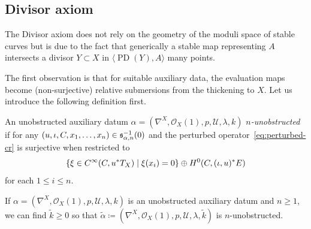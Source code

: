 \documentclass[AHL,Unicode,longabstracts]{cedram}
\makeatletter
\newcommand{\sub}{\subset}
\newcommand{\inv}{^{-1}}
\newcommand{\lspan}[1]{\langle {#1}\rangle}
\newcommand{\inpr}[2]{\langle {#1},{#2} \rangle}
\newcommand{\conn}{\nabla}
\newcommand{\wt}{\widetilde}
\newcommand{\Mbar}{\bar{\mathcal M}}
\newcommand{\bQ}{\mathbb{Q}}
\newcommand{\cO}{\mathcal{O}}
\newcommand{\cU}{\mathcal{U}}
\newcommand{\fs}{\mathfrak{s}}
\DeclareMathOperator{\pcd}{PD}
\let\save@mathaccent\mathaccent
\newcommand*\if@single[3]{%
  \setbox0\hbox{${\mathaccent"0362{#1}}^H$}%
  \setbox2\hbox{${\mathaccent"0362{\kern0pt#1}}^H$}%
  \ifdim\ht0=\ht2 #3\else #2\fi
  }
\newcommand*\rel@kern[1]{\kern#1\dimexpr\macc@kerna}
\newcommand*\widebar[1]{\@ifnextchar^{{\wide@bar{#1}{0}}}{\wide@bar{#1}{1}}}
\newcommand*\wide@bar[2]{\if@single{#1}{\wide@bar@{#1}{#2}{1}}{\wide@bar@{#1}{#2}{2}}}
\newcommand*\wide@bar@[3]{%
  \begingroup
  \def\mathaccent##1##2{%
    \let\mathaccent\save@mathaccent
    \if#32 \let\macc@nucleus\first@char \fi
    \setbox\z@\hbox{$\macc@style{\macc@nucleus}_{}$}%
    \setbox\tw@\hbox{$\macc@style{\macc@nucleus}{}_{}$}%
    \dimen@\wd\tw@
    \advance\dimen@-\wd\z@
    \divide\dimen@ 3
    \@tempdima\wd\tw@
    \advance\@tempdima-\scriptspace
    \divide\@tempdima 10
    \advance\dimen@-\@tempdima
    \ifdim\dimen@>\z@ \dimen@0pt\fi
    \rel@kern{0.6}\kern-\dimen@
    \if#31
      \overline{\rel@kern{-0.6}\kern\dimen@\macc@nucleus\rel@kern{0.4}\kern\dimen@}%
      \advance\dimen@0.4\dimexpr\macc@kerna
      \let\final@kern#2%
      \ifdim\dimen@<\z@ \let\final@kern1\fi
      \if\final@kern1 \kern-\dimen@\fi
    \else
      \overline{\rel@kern{-0.6}\kern\dimen@#1}%
    \fi
  }%
  \macc@depth\@ne
  \let\math@bgroup\@empty \let\math@egroup\macc@set@skewchar
  \mathsurround\z@ \frozen@everymath{\mathgroup\macc@group\relax}%
  \macc@set@skewchar\relax
  \let\mathaccentV\macc@nested@a
  \if#31
    \macc@nested@a\relax111{#1}%
  \else
    \def\gobble@till@marker##1\endmarker{}%
    \futurelet\first@char\gobble@till@marker#1\endmarker
    \ifcat\noexpand\first@char A\else
      \def\first@char{}%
    \fi
    \macc@nested@a\relax111{\first@char}%
  \fi
  \endgroup
}
\let\oldbar\bar
\renewcommand*{\bar}[1]{{\mathchoice{\widebar{#1}}{\widebar{#1}}{\widebar{#1}}{\oldbar{#1}}}}
\let\oldin\in
\renewcommand{\in}{\mathchoice{\oldin}{\oldin}{\,\oldin\,}{\,\oldin\,}}
\makeatother
\begin{document}
\subsection{Divisor axiom}

The Divisor axiom does not rely on the geometry of the moduli space of stable curves but is due to the fact that generically a stable map representing $A$ intersects a divisor $Y\sub X$ in $\lspan{\pcd(Y),A}$ many points.


The first observation is that for suitable auxiliary data, the evaluation maps become (non-surjective) relative submersions from the thickening to $X$. Let us introduce the following definition first.

\begin{defi}
An unobstructed auxiliary datum $\alpha = (\conn^X,\cO_X(1),p,\cU,\lambda,k)$ \emph{$n$-unobstructed} if for any $(u,\iota,C,x_1,\dots,x_n)\in \fs_{\alpha,n}\inv(0)$ and the perturbed operator~\eqref{eq:perturbed-cr} is surjective when restricted to
\begin{equation}\label{vanishing}
\{\xi\in C^\infty(C,{u}^*T_X)\mid \xi(x_i) = 0\}\oplus H^0(C,(\iota,u)^*E)
\end{equation}
for each $1 \leq i \leq n$.
\end{defi}


\begin{lemm}\label{strongly-unobstructed-aux-exist}
If $\alpha =(\conn^X,\cO_X(1),p,\cU,\lambda,k)$ is an unobstructed auxiliary datum and $n \geq 1$, we can find $\wt k \geq 0$ so that $\wt\alpha \coloneqq (\conn^X,\cO_X(1),p,\cU,\lambda,\wt k)$ is $n$-unobstructed.
\end{lemm}
\end{document}
